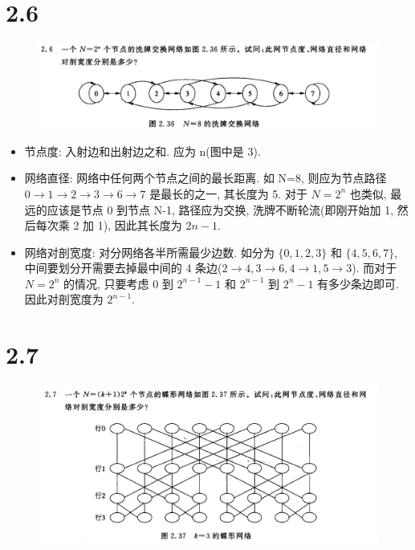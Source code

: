 \documentclass[UTF8]{article}
\begin{document}
\section*{2.6}
\begin{center}
	\begin{figure}[H]
		\centering
		\includegraphics[width=\linewidth]{image/2.6.png}
	\end{figure}
\end{center}

\begin{itemize}
	\item 节点度: 入射边和出射边之和. 应为 n(图中是 3).
	\item 网络直径: 网络中任何两个节点之间的最长距离. 如 N=8, 则应为节点路径 $0\rightarrow 1\rightarrow 2\rightarrow 3 \rightarrow 6 \rightarrow 7$ 是最长的之一, 其长度为 5. 对于 $N=2^n$ 也类似, 最远的应该是节点 0 到节点 N-1, 路径应为交换, 洗牌不断轮流(即刚开始加 1, 然后每次乘 2 加 1), 因此其长度为 $2n-1$.
	\item 网络对剖宽度: 对分网络各半所需最少边数. 如分为 $\{0,1,2,3\}$ 和 $\{4,5,6,7\}$, 中间要划分开需要去掉最中间的 4 条边($2\rightarrow4, 3\rightarrow6,4\rightarrow1,5\rightarrow3$). 而对于 $N=2^n$ 的情况, 只要考虑 $0$ 到 $2^{n-1}-1$ 和 $2^{n-1}$ 到 $2^{n}-1$ 有多少条边即可. 因此对剖宽度为 $2^{n-1}$.
\end{itemize}

\section*{2.7}
\begin{center}
\begin{figure}[H]
	\centering
	\includegraphics[width=\linewidth]{image/2.7.png}
\end{figure}
\end{center}
\end{document}
